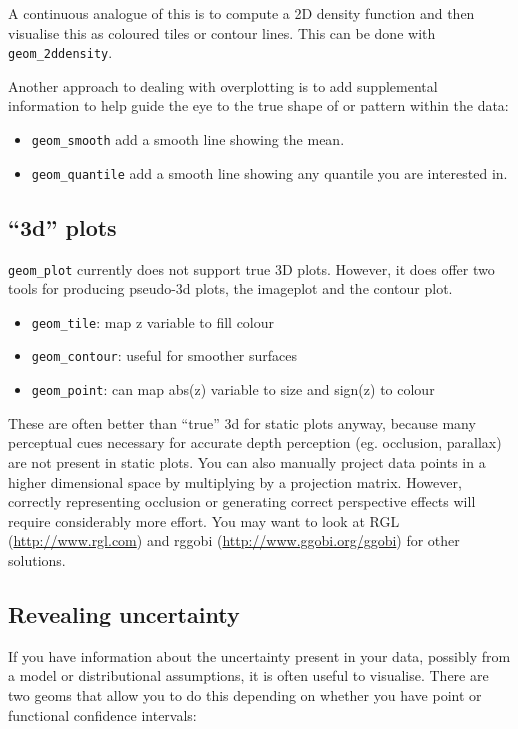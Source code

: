 A continuous analogue of this is to compute a 2D density function and then visualise this as coloured tiles or contour lines.  This can be done with {\tt geom\_2ddensity}.

Another approach to dealing with overplotting is to add supplemental information to help guide the eye to the true shape of or pattern within the data:

\begin{itemize}
	\item {\tt geom\_smooth} add a smooth line showing the mean.
	\item {\tt geom\_quantile} add a smooth line showing any quantile you are interested in.
\end{itemize}

\subsection{``3d'' plots}

{\tt geom\_plot} currently does not support true 3D plots.  However, it does offer two tools for producing pseudo-3d plots, the imageplot and the contour plot.

\begin{itemize}
	\item {\tt geom\_tile}: map z variable to fill colour
	\item {\tt geom\_contour}: useful for smoother surfaces
	\item {\tt geom\_point}: can map abs(z) variable to size and sign(z) to colour
\end{itemize}

These are often better than ``true'' 3d for static plots anyway, because many perceptual cues necessary for accurate depth perception (eg. occlusion, parallax) are not present in static plots.  You can also manually project data points in a higher dimensional space by multiplying by a projection matrix.  However, correctly representing occlusion or generating correct perspective effects will require considerably more effort.  You may want to look at RGL (\url{http://www.rgl.com}) and rggobi (\url{http://www.ggobi.org/ggobi}) for other solutions.

\subsection{Revealing uncertainty}\label{sub:displaying_uncertainty}

If you have information about the uncertainty present in your data, possibly from a model or distributional assumptions, it is often useful to visualise.  There are two geoms that allow you to do this depending on whether you have point or functional confidence intervals:

